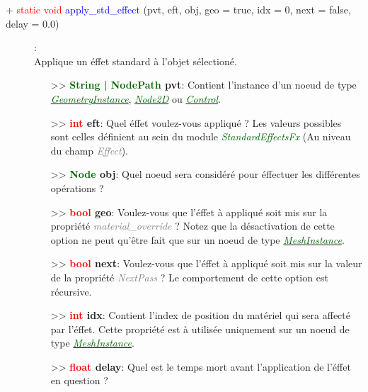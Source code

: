 \documentclass[a4paper, 11pt]{article}
\begin{document}
	\begin{description}
		\item [+ \textcolor{red}{static void} \textcolor{blue}{apply\_std\_effect} (pvt, eft, obj, geo =
		true, idx = 0, next = false, delay = 0.0)]: \\Applique un éffet standard à l'objet sélectioné.
		\begin{itemize}
			\item[>> \textbf{\textcolor{darkgreen}{String | NodePath} pvt}:] Contient l'instance 
			d'un noeud de type
			\href{https://docs.godotengine.org/fr/stable/classes/class_geometryinstance.html}
			{\textit{\textcolor{darkgreen}{GeometryInstance}}},
			\href{https://docs.godotengine.org/fr/stable/classes/class_node2d.html}
			{\textit{\textcolor{darkgreen}{Node2D}}} ou
			\href{https://docs.godotengine.org/fr/stable/classes/class_control.html}
			{\textit{\textcolor{darkgreen}{Control}}}.
			\item[>> \textbf{\textcolor{red}{int} eft}:] Quel éffet voulez-vous appliqué ? Les valeurs
			possibles sont celles définient au sein du module \textit{\textcolor{darkgreen}
			{StandardEffectsFx}} (Au niveau du champ \textit{\textcolor{gray}{Effect}}).
			\item [>> \textbf{\textcolor{darkgreen}{Node} obj}:] Quel noeud sera considéré pour éffectuer 
			les différentes opérations ?
			\item[>> \textbf{\textcolor{red}{bool} geo}:] Voulez-vous que l'éffet à appliqué soit mis sur
			la propriété \textit{\textcolor{gray}{material\_override}} ? Notez que la désactivation de cette 
			option ne peut qu'être fait que sur un noeud de type
			\href{https://docs.godotengine.org/fr/stable/classes/class_meshinstance.html}
			{\textit{\textcolor{darkgreen}{MeshInstance}}}.
			\item[>> \textbf{\textcolor{red}{bool} next}:] Voulez-vous que l'éffet à appliqué soit mis sur 
			la valeur de la propriété \textit{\textcolor{gray}{NextPass}} ? Le comportement de cette option 
			est récursive.
			\item[>> \textbf{\textcolor{red}{int} idx}:] Contient l'index de position du matériel qui sera
			affecté par l'éffet. Cette propriété est à utilisée uniquement sur un noeud de type
			\href{https://docs.godotengine.org/fr/stable/classes/class_meshinstance.html}
			{\textit{\textcolor{darkgreen}{MeshInstance}}}.
			\item[>> \textbf{\textcolor{red}{float} delay}:] Quel est le temps mort avant l'application de 
			l'éffet en question ?\\
		\end{itemize}
	\end{description}
\end{document}
